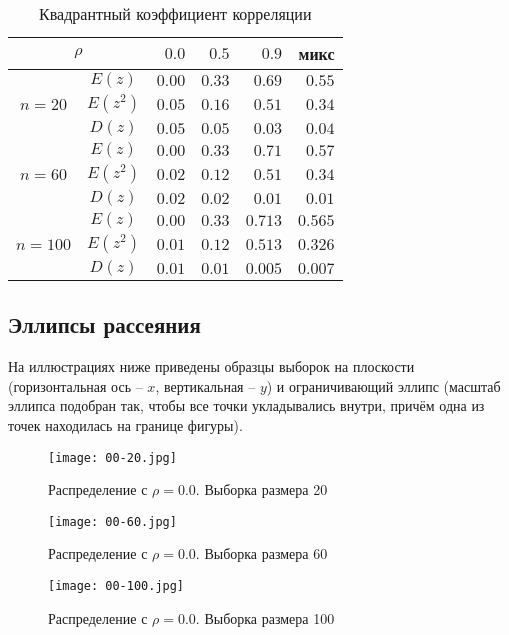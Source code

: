 \documentclass[main.tex]{subfiles}
\begin{document}
\begin{table}[H]
	\centering
	\caption{Квадрантный коэффициент корреляции}
	\begin{tabular}{cc*4r}
		\toprule
		\multicolumn{2}{c}{$\rho$} & $0.0$ & $0.5$ & $0.9$ & микс \\
		\midrule
		\multirow{3}{*}{ $n=20$ }
		& $E(z)$   & $0.00$  & $0.33$ & $0.69$ & $0.55$ \\
		& $E(z^2)$ & $0.05$  & $0.16$ & $0.51$ & $0.34$ \\
		& $D(z)$   & $0.05$  & $0.05$ & $0.03$ & $0.04$ \\
		\multirow{3}{*}{ $n=60$ }
		& $E(z)$   & $0.00$  & $0.33$ & $0.71$ & $0.57$ \\
		& $E(z^2)$ & $0.02$  & $0.12$ & $0.51$ & $0.34$ \\
		& $D(z)$   & $0.02$  & $0.02$ & $0.01$ & $0.01$ \\
		\multirow{3}{*}{ $n=100$ }
		& $E(z)$   & $0.00$  & $0.33$ & $0.713$ & $0.565$ \\
		& $E(z^2)$ & $0.01$  & $0.12$ & $0.513$ & $0.326$ \\
		& $D(z)$   & $0.01$  & $0.01$ & $0.005$ & $0.007$ \\
		\bottomrule
	\end{tabular}
	\label{table:quadrant}
\end{table}

\subsection{Эллипсы рассеяния}
На иллюстрациях ниже приведены образцы выборок на плоскости (горизонтальная ось -- $x$, вертикальная -- $y$) и ограничивающий эллипс (масштаб эллипса подобран так, чтобы все точки укладывались внутри, причём одна из точек находилась на границе фигуры).
\begin{figure}[H]
	\centering \texttt{[image: 00-20.jpg]}
	\caption{Распределение с $\rho=0.0$. Выборка размера 20}
	\label{img:00-20}
\end{figure}
\begin{figure}[H]
	\centering \texttt{[image: 00-60.jpg]}
	\caption{Распределение с $\rho=0.0$. Выборка размера 60}
\end{figure}
\begin{figure}[H]
	\centering \texttt{[image: 00-100.jpg]}
	\caption{Распределение с $\rho=0.0$. Выборка размера 100}
\end{figure}
\end{document}
